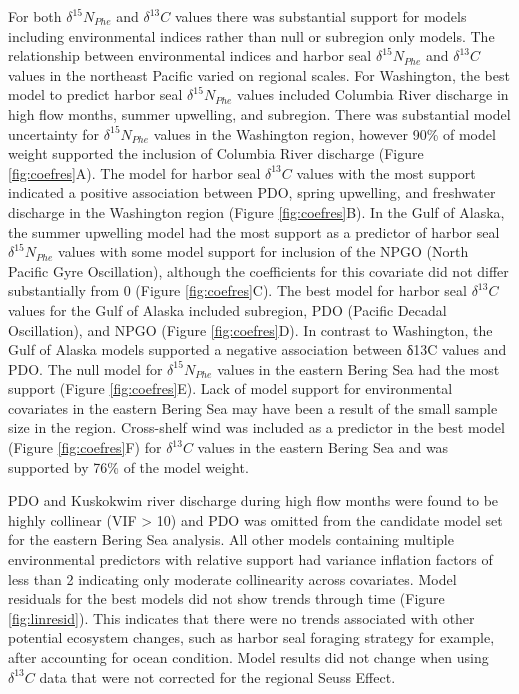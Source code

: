 \documentclass [11pt, proquest] {uwthesis}[2015/03/03]
\begin{document}
For both \(\delta^{15}N_{Phe}\) and \(\delta^{13}C\) values there was
substantial support for models including environmental indices rather
than null or subregion only models. The relationship between
environmental indices and harbor seal \(\delta^{15}N_{Phe}\) and
\(\delta^{13}C\) values in the northeast Pacific varied on regional
scales. For Washington, the best model to predict harbor seal
\(\delta^{15}N_{Phe}\) values included Columbia River discharge in high
flow months, summer upwelling, and subregion. There was substantial
model uncertainty for \(\delta^{15}N_{Phe}\) values in the Washington
region, however 90\% of model weight supported the inclusion of Columbia
River discharge (Figure \ref{fig:coefres}A). The model for harbor seal
\(\delta^{13}C\) values with the most support indicated a positive
association between PDO, spring upwelling, and freshwater discharge in
the Washington region (Figure \ref{fig:coefres}B). In the Gulf of
Alaska, the summer upwelling model had the most support as a predictor
of harbor seal \(\delta^{15}N_{Phe}\) values with some model support for
inclusion of the NPGO (North Pacific Gyre Oscillation), although the
coefficients for this covariate did not differ substantially from 0
(Figure \ref{fig:coefres}C). The best model for harbor seal
\(\delta^{13}C\) values for the Gulf of Alaska included subregion, PDO
(Pacific Decadal Oscillation), and NPGO (Figure \ref{fig:coefres}D). In
contrast to Washington, the Gulf of Alaska models supported a negative
association between δ13C values and PDO. The null model for
\(\delta^{15}N_{Phe}\) values in the eastern Bering Sea had the most
support (Figure \ref{fig:coefres}E). Lack of model support for
environmental covariates in the eastern Bering Sea may have been a
result of the small sample size in the region. Cross-shelf wind was
included as a predictor in the best model (Figure \ref{fig:coefres}F)
for \(\delta^{13}C\) values in the eastern Bering Sea and was supported
by 76\% of the model weight.

PDO and Kuskokwim river discharge during high flow months were found to
be highly collinear (VIF \textgreater{} 10) and PDO was omitted from the
candidate model set for the eastern Bering Sea analysis. All other
models containing multiple environmental predictors with relative
support had variance inflation factors of less than 2 indicating only
moderate collinearity across covariates. Model residuals for the best
models did not show trends through time (Figure \ref{fig:linresid}).
This indicates that there were no trends associated with other potential
ecosystem changes, such as harbor seal foraging strategy for example,
after accounting for ocean condition. Model results did not change when
using \(\delta^{13}C\) data that were not corrected for the regional
Seuss Effect.
\end{document}
